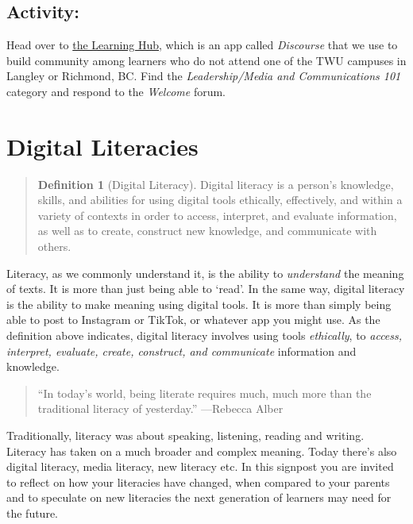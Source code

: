 \documentclass[
]{book}
\theoremstyle{definition}
\newtheorem{definition}{Definition}[chapter]
\theoremstyle{definition}
\theoremstyle{definition}
\theoremstyle{definition}
\theoremstyle{remark}
\begin{document}
\hypertarget{activity}{%
\subsection*{Activity:}\label{activity}}

\begin{reflect}
Head over to \href{https://twu.discourse.group}{the Learning Hub}, which is an app called \emph{Discourse} that we use to build community among learners who do not attend one of the TWU campuses in Langley or Richmond, BC. Find the \emph{Leadership/Media and Communications 101} category and respond to the \emph{Welcome} forum.
\end{reflect}

\hypertarget{digital-literacies}{%
\section{Digital Literacies}\label{digital-literacies}}

\begin{quote}
\begin{definition}[Digital Literacy]
\protect\hypertarget{def:diglit}{}\label{def:diglit}Digital literacy is a person's knowledge, skills, and abilities for using digital tools ethically, effectively, and within a variety of contexts in order to access, interpret, and evaluate information, as well as to create, construct new knowledge, and communicate with others. \citep{digitallearningadvisorycommitteePostSecondaryDigitalLearning2022}
\end{definition}
\end{quote}

Literacy, as we commonly understand it, is the ability to \emph{understand} the meaning of texts. It is more than just being able to `read'. In the same way, digital literacy is the ability to make meaning using digital tools. It is more than simply being able to post to Instagram or TikTok, or whatever app you might use. As the definition above indicates, digital literacy involves using tools \emph{ethically}, to \emph{access, interpret, evaluate, create, construct, and communicate} information and knowledge.

\begin{quote}
``In today's world, being literate requires much, much more than the traditional literacy of yesterday.''
---Rebecca Alber
\end{quote}

Traditionally, literacy was about speaking, listening, reading and writing. Literacy has taken on a much broader and complex meaning. Today there's also digital literacy, media literacy, new literacy etc. In this signpost you are invited to reflect on how your literacies have changed, when compared to your parents and to speculate on new literacies the next generation of learners may need for the future.
\end{document}
